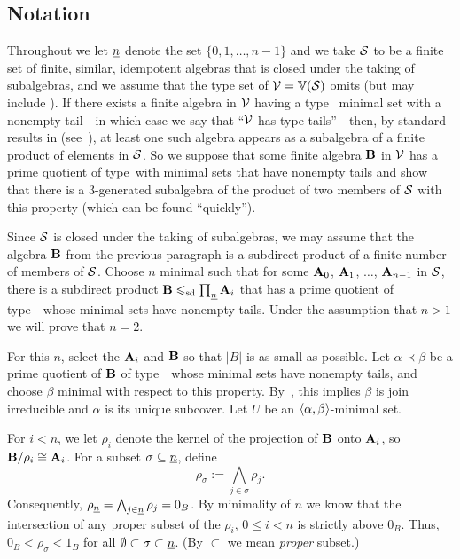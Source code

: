 \subsection{Notation}
Throughout we let $\underline{n}$ denote the set $\{0,1,\dots, n-1\}$ and
we take $\mathcal{S}$ to be a finite set of finite,
similar, idempotent algebras that is closed under the taking of
subalgebras, and we assume that the type set of
$\mathcal{V} = \operatorname{\mathbb{V}}(\mathcal{S})$ omits \utyp (but may include \styp).
If there exists a finite algebra in $\mathcal{V}$ having a type \atyp\ minimal
set with a nonempty tail---in which case we say that
``$\mathcal{V}$ has type \atyp tails''---then,
by standard results in \tct (see~\cite{HM:1988}),
at least one such algebra appears as a subalgebra of a finite product of
elements in $\mathcal{S}$.
So we suppose that some finite algebra
$\mathbf{B}$ in $\mathcal{V}$ has a prime quotient of type~\atyp with
minimal sets that have
nonempty tails and show that there is a 3-generated
subalgebra of the
product of two members of $\mathcal{S}$ with this property (which can be found ``quickly'').

Since $\mathcal{S}$ is closed under the taking of subalgebras,
we may assume that the algebra $\mathbf{B}$ from the previous paragraph is a subdirect
product of a finite number of members of $\mathcal{S}$. Choose $n$ minimal such that for
some $\mathbf{A}_0$, $\mathbf{A}_1$, $\dots$, $\mathbf{A}_{n-1}$ in $\mathcal{S}$, there is a subdirect
product $\mathbf{B} \leqslant_{\mathrm{sd}} \prod_{\underline{n}} \mathbf{A}_i$
that has a prime quotient of type~\atyp\ whose minimal sets have
nonempty tails.
Under the assumption that $n > 1$ we will prove that $n = 2$.

For this $n$, select the $\mathbf{A}_i$ and $\mathbf{B}$ so that $|B|$ is as small as possible.
Let $\alpha \prec \beta$ be a prime quotient of $\mathbf{B}$
of type~\atyp\ whose minimal sets have
nonempty tails, and choose $\beta$ minimal with respect to this property.
By~\cite[Lemma 6.2]{HM:1988}, this implies $\beta$ is join
irreducible and $\alpha$ is its unique subcover.
Let $U$ be an $\langle\alpha, \beta\rangle$-minimal set.

For $i < n$, we let $\rho_i$ denote the kernel of the projection
of $\mathbf{B}$ onto $\mathbf{A}_i$, so $\mathbf{B}/\rho_i \cong \mathbf{A}_i$.
For a subset $\sigma \subseteq \underline{n}$, define
\[
\rho_\sigma := \bigwedge_{j\in \sigma} \rho_j.
\]
Consequently,
$\rho_{\underline{n}} = \bigwedge_{j\in \underline{n}}\rho_j = 0_{B}$.
By minimality of $n$ we know that the intersection of any  proper subset of the
$\rho_i$, $0\leq i < n$ is strictly above $0_B$.  Thus,
$0_B < \rho_\sigma < 1_B$ for all
$\emptyset \subset \sigma\subset \underline{n}$.
(By $\subset$ we mean \emph{proper} subset.)

